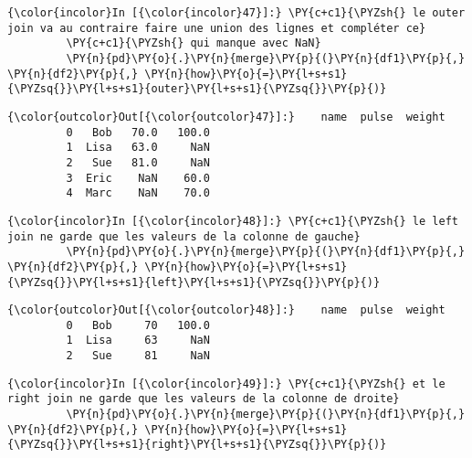     \begin{Verbatim}[commandchars=\\\{\},frame=single,framerule=0.3mm,rulecolor=\color{cellframecolor}]
{\color{incolor}In [{\color{incolor}47}]:} \PY{c+c1}{\PYZsh{} le outer join va au contraire faire une union des lignes et compléter ce}
         \PY{c+c1}{\PYZsh{} qui manque avec NaN}
         \PY{n}{pd}\PY{o}{.}\PY{n}{merge}\PY{p}{(}\PY{n}{df1}\PY{p}{,} \PY{n}{df2}\PY{p}{,} \PY{n}{how}\PY{o}{=}\PY{l+s+s1}{\PYZsq{}}\PY{l+s+s1}{outer}\PY{l+s+s1}{\PYZsq{}}\PY{p}{)}
\end{Verbatim}


\begin{Verbatim}[commandchars=\\\{\},frame=single,framerule=0.3mm,rulecolor=\color{cellframecolor}]
{\color{outcolor}Out[{\color{outcolor}47}]:}    name  pulse  weight
         0   Bob   70.0   100.0
         1  Lisa   63.0     NaN
         2   Sue   81.0     NaN
         3  Eric    NaN    60.0
         4  Marc    NaN    70.0
\end{Verbatim}
            
    \begin{Verbatim}[commandchars=\\\{\},frame=single,framerule=0.3mm,rulecolor=\color{cellframecolor}]
{\color{incolor}In [{\color{incolor}48}]:} \PY{c+c1}{\PYZsh{} le left join ne garde que les valeurs de la colonne de gauche}
         \PY{n}{pd}\PY{o}{.}\PY{n}{merge}\PY{p}{(}\PY{n}{df1}\PY{p}{,} \PY{n}{df2}\PY{p}{,} \PY{n}{how}\PY{o}{=}\PY{l+s+s1}{\PYZsq{}}\PY{l+s+s1}{left}\PY{l+s+s1}{\PYZsq{}}\PY{p}{)}
\end{Verbatim}


\begin{Verbatim}[commandchars=\\\{\},frame=single,framerule=0.3mm,rulecolor=\color{cellframecolor}]
{\color{outcolor}Out[{\color{outcolor}48}]:}    name  pulse  weight
         0   Bob     70   100.0
         1  Lisa     63     NaN
         2   Sue     81     NaN
\end{Verbatim}
            
    \begin{Verbatim}[commandchars=\\\{\},frame=single,framerule=0.3mm,rulecolor=\color{cellframecolor}]
{\color{incolor}In [{\color{incolor}49}]:} \PY{c+c1}{\PYZsh{} et le right join ne garde que les valeurs de la colonne de droite}
         \PY{n}{pd}\PY{o}{.}\PY{n}{merge}\PY{p}{(}\PY{n}{df1}\PY{p}{,} \PY{n}{df2}\PY{p}{,} \PY{n}{how}\PY{o}{=}\PY{l+s+s1}{\PYZsq{}}\PY{l+s+s1}{right}\PY{l+s+s1}{\PYZsq{}}\PY{p}{)}
\end{Verbatim}


